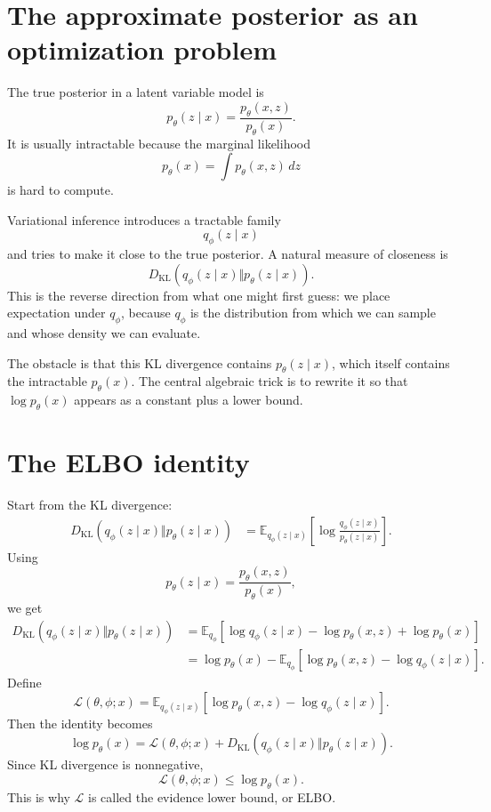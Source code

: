 
\section{The approximate posterior as an optimization problem}

The true posterior in a latent variable model is
\[
  p_\theta(z\mid x)=\frac{p_\theta(x,z)}{p_\theta(x)}.
\]
It is usually intractable because the marginal likelihood
\[
  p_\theta(x)=\int p_\theta(x,z)\,dz
\]
is hard to compute.

Variational inference introduces a tractable family
\[
  q_\phi(z\mid x)
\]
and tries to make it close to the true posterior.  A natural measure of closeness is
\[
  D_{\mathrm{KL}}(q_\phi(z\mid x)\Vert p_\theta(z\mid x)).
\]
This is the reverse direction from what one might first guess: we place expectation under \(q_\phi\), because \(q_\phi\) is the distribution from which we can sample and whose density we can evaluate.

The obstacle is that this KL divergence contains \(p_\theta(z\mid x)\), which itself contains the intractable \(p_\theta(x)\).  The central algebraic trick is to rewrite it so that \(\log p_\theta(x)\) appears as a constant plus a lower bound.

\section{The ELBO identity}

Start from the KL divergence:
\[
\begin{aligned}
D_{\mathrm{KL}}(q_\phi(z\mid x)\Vert p_\theta(z\mid x))
&=\mathbb E_{q_\phi(z\mid x)}
\left[\log\frac{q_\phi(z\mid x)}{p_\theta(z\mid x)}\right].
\end{aligned}
\]
Using
\[
  p_\theta(z\mid x)=\frac{p_\theta(x,z)}{p_\theta(x)},
\]
we get
\[
\begin{aligned}
D_{\mathrm{KL}}(q_\phi(z\mid x)\Vert p_\theta(z\mid x))
&=\mathbb E_{q_\phi}
\left[\log q_\phi(z\mid x)-\log p_\theta(x,z)+\log p_\theta(x)\right]\\
&=\log p_\theta(x)
-\mathbb E_{q_\phi}
\left[\log p_\theta(x,z)-\log q_\phi(z\mid x)\right].
\end{aligned}
\]
Define
\[
  \mathcal L(\theta,\phi;x)
  =\mathbb E_{q_\phi(z\mid x)}
  \left[\log p_\theta(x,z)-\log q_\phi(z\mid x)\right].
\]
Then the identity becomes
\[
  \log p_\theta(x)
  =\mathcal L(\theta,\phi;x)
  +D_{\mathrm{KL}}(q_\phi(z\mid x)\Vert p_\theta(z\mid x)).
\]
Since KL divergence is nonnegative,
\[
  \mathcal L(\theta,\phi;x)\le \log p_\theta(x).
\]
This is why \(\mathcal L\) is called the evidence lower bound, or ELBO.

